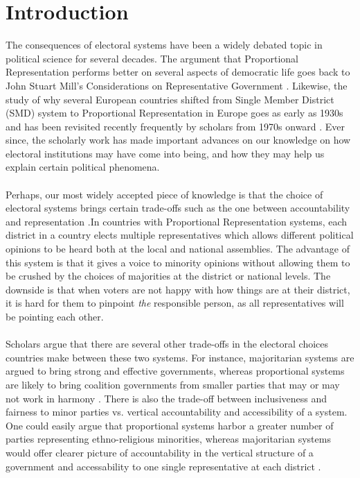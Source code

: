 \documentclass{article}
\begin{document}
\section{Introduction}
The consequences of electoral systems have been a widely debated topic in political science for several decades. The argument that Proportional 
Representation performs better on several aspects of democratic life goes back to John Stuart Mill's Considerations on  Representative Government \cite{mill1861considerations}. Likewise, the study of why several European countries shifted from Single Member District (SMD) system to Proportional Representation in Europe goes as early as 1930s \cite{braunias1932parlamentarische} and has been revisited recently frequently by scholars from 1970s onward \cite{rokkan_citizens_1970, boix_setting_1999, cusack_economic_2007}. Ever since, the scholarly work has made important advances on our knowledge on how electoral institutions may have come into being, and how they may help us explain certain political phenomena.\\

\\
Perhaps, our most widely accepted piece of knowledge is that the choice of electoral systems brings certain trade-offs such as the one between accountability and representation \cite{diamond1999developing,carey_electoral_2011,persson_economic_2003,britain1998report}.In countries with Proportional Representation systems, each district in a country elects multiple representatives which allows different political opinions to be heard both at the local and national assemblies. The advantage of this system is that it gives a voice to minority opinions without allowing them to be crushed by the choices of majorities at the district or national levels. The downside is that when voters are not happy with how things are at their district, it is hard for them to pinpoint \textit{the} responsible person, as all representatives will be pointing each other. \\
\\
Scholars argue that there are several other trade-offs in the electoral choices countries make between these two systems. For instance, majoritarian systems are argued to bring strong and effective governments, whereas proportional systems are likely to bring coalition governments from smaller parties that may or may not work in harmony \cite{norris1997choosing}. There is also the trade-off between inclusiveness and fairness to minor parties vs. vertical accountability and accessibility of a system\cite{norris1997choosing, diamond1999developing}. One could easily argue that proportional systems harbor a greater number of parties representing ethno-religious minorities, whereas majoritarian systems would offer clearer picture of accountability in the vertical structure of a government and accessability to one single representative at each district \cite{norris1997choosing, diamond1999developing}. \\
\end{document}
